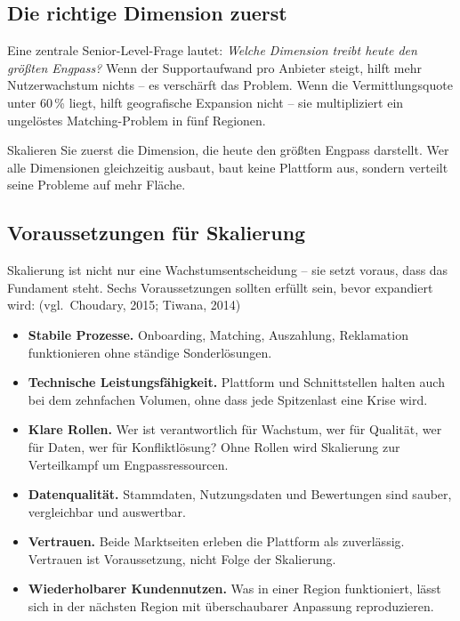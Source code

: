 \documentclass[11pt,a4paper,oneside]{article}
\newcommand{\quelle}[1]{{\footnotesize\color{lpGray}(#1)}}
\begin{document}
\subsection{Die richtige Dimension zuerst}

Eine zentrale Senior-Level-Frage lautet: \emph{Welche Dimension treibt heute den größten Engpass?} Wenn der Supportaufwand pro Anbieter steigt, hilft mehr Nutzerwachstum nichts -- es verschärft das Problem. Wenn die Vermittlungsquote unter 60\,\% liegt, hilft geografische Expansion nicht -- sie multipliziert ein ungelöstes Matching-Problem in fünf Regionen.

\begin{merkbox}
Skalieren Sie zuerst die Dimension, die heute den größten Engpass darstellt. Wer alle Dimensionen gleichzeitig ausbaut, baut keine Plattform aus, sondern verteilt seine Probleme auf mehr Fläche.
\end{merkbox}

\subsection{Voraussetzungen für Skalierung}

Skalierung ist nicht nur eine Wachstumsentscheidung -- sie setzt voraus, dass das Fundament steht. Sechs Voraussetzungen sollten erfüllt sein, bevor expandiert wird: \quelle{vgl.\ Choudary, 2015; Tiwana, 2014}

\begin{itemize}
  \item \textbf{Stabile Prozesse.} Onboarding, Matching, Auszahlung, Reklamation funktionieren ohne ständige Sonderlösungen.
  \item \textbf{Technische Leistungsfähigkeit.} Plattform und Schnittstellen halten auch bei dem zehnfachen Volumen, ohne dass jede Spitzenlast eine Krise wird.
  \item \textbf{Klare Rollen.} Wer ist verantwortlich für Wachstum, wer für Qualität, wer für Daten, wer für Konfliktlösung? Ohne Rollen wird Skalierung zur Verteilkampf um Engpassressourcen.
  \item \textbf{Datenqualität.} Stammdaten, Nutzungsdaten und Bewertungen sind sauber, vergleichbar und auswertbar.
  \item \textbf{Vertrauen.} Beide Marktseiten erleben die Plattform als zuverlässig. Vertrauen ist Voraussetzung, nicht Folge der Skalierung.
  \item \textbf{Wiederholbarer Kundennutzen.} Was in einer Region funktioniert, lässt sich in der nächsten Region mit überschaubarer Anpassung reproduzieren.
\end{itemize}
\end{document}
